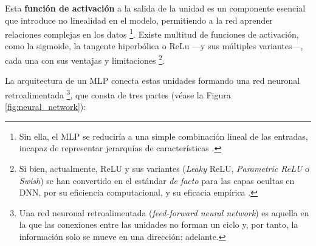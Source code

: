 Esta \textbf{función de activación} a la salida de la unidad es un componente esencial que introduce no 
linealidad en el modelo, permitiendo a la red aprender relaciones complejas en los datos%
\footnote{
    Sin ella, el MLP se reduciría a una simple combinación lineal de las entradas, incapaz de
    representar jerarquías de características \cite{murphy2022}.
}.
Existe multitud de funciones de activación, como la sigmoide, la tangente hiperbólica o ReLu ---y sus 
múltiples variantes---, cada una con sus ventajas y limitaciones%
\footnote{
    Si bien, actualmente, ReLU y sus variantes (\textit{Leaky} ReLU, \textit{Parametric ReLU} o 
    \textit{Swish}) se han convertido en el estándar \textit{de facto} para las capas ocultas en \acrshort{DNN},
    por su eficiencia computacional, y su eficacia empírica \cite{vargas2021}.
}.

La arquitectura de un \acrshort{MLP} conecta estas unidades formando una red neuronal retroalimentada%
\footnote{
    Una red neuronal retroalimentada (\textit{feed-forward neural network}) es aquella en la que las 
    conexiones entre las unidades no forman un ciclo y, por tanto, la información solo se mueve en una 
    dirección: adelante.
},
que consta de tres partes (véase la Figura \ref{fig:neural_network}):

